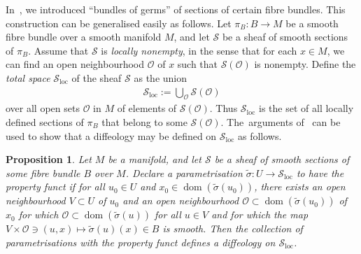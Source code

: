\documentclass[pdftex]{sigma}
\numberwithin{equation}{section}
\newtheorem{Proposition}[Theorem]{Proposition}
\def\loc{\operatorname{loc}}
\def\dom{\operatorname{dom}}
\def\OO{{\mathcal{O}}}
\def\SS{{\mathscr{S}}}
\begin{document}
In~\cite{mac3}, we introduced ``bundles of germs'' of sections of certain fibre bundles. This construction can be generalised easily as follows. Let $\pi_{B}\colon B\rightarrow M$ be a smooth fibre bundle over a smooth manifold $M$, and let $\SS$ be a sheaf of smooth sections of $\pi_{B}$. Assume that $\SS$ is \textit{locally nonempty}, in the sense that for each $x\in M$, we can find an open neighbourhood $\mathcal{O}$ of $x$ such that $\SS(\mathcal{O})$ is nonempty. Define the \textit{total space} $\SS_{\loc}$ of the sheaf $\SS$ as the union
\begin{gather*}
\SS_{\loc}:=\bigcup_{\mathcal{O}}\SS(\mathcal{O})
\end{gather*}
over all open sets $\mathcal{O}$ in $M$ of elements of $\SS(\mathcal{O})$. Thus $\SS_{\loc}$ is the set of all locally defined sections of $\pi_{B}$ that belong to some $\SS(\mathcal{O})$. The~arguments of~\cite[Section~1.63]{diffeology} can be used to show that a diffeology may be defined on $\SS_{\loc}$ as follows.

\begin{Proposition}\label{functprop}
Let $M$ be a manifold, and let $\SS$ be a sheaf of smooth sections of some fibre bundle $B$ over $M$. Declare a parametrisation $\tilde{\sigma}\colon U\rightarrow \SS_{\loc}$ to have the property \textit{funct} if for all $u_{0}\in U$ and $x_{0}\in\dom(\tilde{\sigma}(u_{0}))$, there exists an open neighbourhood $V\subset U$ of $u_{0}$ and an open neighbourhood $\OO\subset \dom(\tilde{\sigma}(u_{0}))$ of $x_{0}$ for which $\OO\subset\dom(\tilde{\sigma}(u))$ for all $u\in V$ and for which the map $V\times\OO\ni(u,x)\mapsto\tilde{\sigma}(u)(x)\in B$ is smooth. Then the collection of parametrisations with the property \textit{funct} defines a diffeology on $\SS_{\loc}$.
\end{Proposition}
\end{document}
